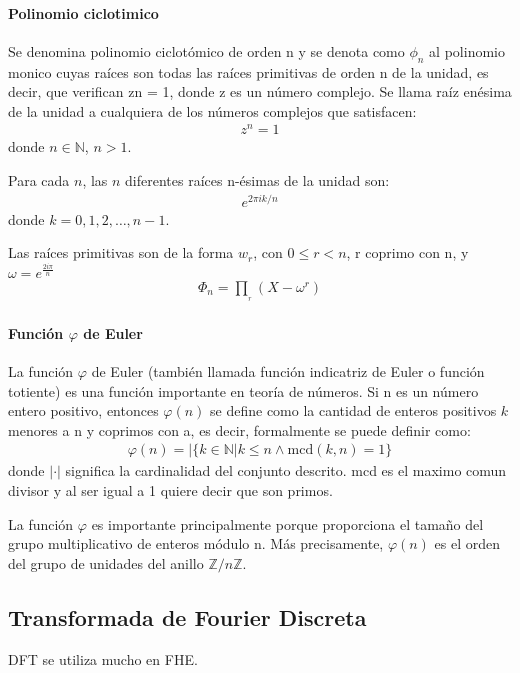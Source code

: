 \documentclass[12pt, oneside]{article}
\newcommand{\N}{\mathbb{N}}
\begin{document}
\paragraph{Polinomio ciclotimico}
Se denomina polinomio ciclotómico de orden n y se denota como $\phi_n$ al
polinomio monico cuyas raíces son todas las raíces primitivas de orden n de la unidad,
es decir, que verifican zn = 1, donde z es un número complejo.
Se llama raíz enésima de la unidad a cualquiera de los números complejos que
satisfacen:
\begin{align*}
  z^{n}=1
\end{align*}
donde $n\in\N$, $n>1$.

Para cada $n$, las $n$ diferentes raíces n-ésimas de la unidad son:
\begin{align*}
  e^{2\pi ik/n}
\end{align*}
 donde $k=0,1,2,\dots ,n-1$.

 Las raíces primitivas son de la forma $w_r$, con $0 \leq r < n$, r coprimo con n, y $\omega =e^{\frac {2i\pi }{n}}$
\begin{align*}
 \Phi _{n}=\prod _{{}_{r}}(X-\omega ^{r})
\end{align*}
 \paragraph{Función $\varphi$ de Euler}
 La función $\varphi$ de Euler (también llamada función indicatriz de Euler o función totiente)
 es una función importante en teoría de números.
 Si n es un número entero positivo,  entonces $\varphi(n)$ se define como la
 cantidad de enteros positivos $k$ menores a n y
 coprimos con a, es decir, formalmente se puede definir como:
 \begin{align*}
 \varphi(n)=|\{k\in \mathbb {N} |k\leq n\land \mathrm {mcd} (k,n)=1\}
 \end{align*}
 donde $|·|$ significa la cardinalidad del conjunto descrito.
 mcd es el maximo comun divisor y al ser igual a 1 quiere decir que son primos.

La función $\varphi$ es importante principalmente porque proporciona el tamaño del
grupo multiplicativo de enteros módulo n.
Más precisamente, $\varphi (n)$ es el orden del grupo de unidades del anillo
$\mathbb {Z} /n\mathbb {Z}$.

\subsection{Transformada de Fourier Discreta}
DFT se utiliza mucho en FHE.
\end{document}
